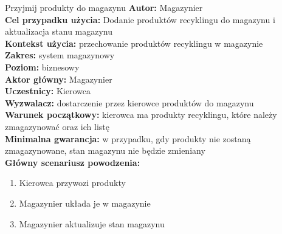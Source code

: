 \begin{usecase}{Przyjmij produkty do magazynu}
	\textbf{Autor:} Magazynier\\
	\textbf{Cel przypadku użycia:} Dodanie produktów recyklingu do magazynu i aktualizacja stanu magazynu \\
	\textbf{Kontekst użycia:} przechowanie produktów recyklingu w magazynie\\
	\textbf{Zakres:} system magazynowy \\
	\textbf{Poziom:} biznesowy \\
	\textbf{Aktor główny:} Magazynier \\
	\textbf{Uczestnicy:} Kierowca \\
	\textbf{Wyzwalacz:} dostarczenie przez kierowce produktów do magazynu \\
	\textbf{Warunek początkowy:} kierowca ma produkty recyklingu, które należy zmagazynować oraz ich listę \\
	\textbf{Minimalna gwarancja:} w przypadku, gdy produkty nie zostaną zmagazynowane, stan magazynu nie będzie zmieniany \\
	\textbf{Główny scenariusz powodzenia:} \\
		\begin{enumerate}
			\item Kierowca przywozi produkty
			\item Magazynier układa je w magazynie
			\item Magazynier aktualizuje stan magazynu
		\end{enumerate}
\end{usecase}

